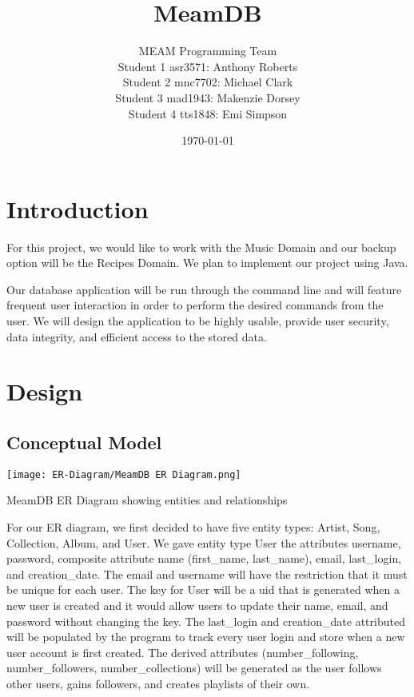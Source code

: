 \documentclass[12pt]{article}
\title{MeamDB}
\date{\today}
\author{MEAM Programming Team \\
Student 1 asr3571: Anthony Roberts\\
Student 2 mnc7702: Michael Clark\\
Student 3 mad1943: Makenzie Dorsey\\
Student 4 tts1848: Emi Simpson\\
}
\begin{document}
    \maketitle

    \section{Introduction}
    For this project, we would like to work with the Music Domain
    and our backup option will be the Recipes Domain. We plan to
    implement our project using Java.

    \vspace{0.5cm}

    \noindent Our database application will be run through the command line
    and will feature frequent user interaction in order to perform the desired
    commands from the user. We will design the application to be highly usable,
    provide user security, data integrity, and efficient access to the stored data.

    \section{Design}
    \subsection{Conceptual Model}

    \vspace{0.5cm}


    \begin{center}
    \texttt{[image: ER-Diagram/MeamDB ER Diagram.png]}
    \end{center}
    \caption{MeamDB ER Diagram showing entities and relationships}
    \label{ER Diagram}

    \vspace{0.5cm}

    \noindent For our ER diagram, we first decided to have five entity types:
    Artist, Song, Collection, Album, and User. We gave entity type User the attributes
    username, password, composite attribute name (first\_name, last\_name), email,
    last\_login, and creation\_date. The email and username will have the restriction that it must be unique
    for each user. The key for User will be a uid that is generated when a new user is
    created and it would allow users to update their name, email, and password without
    changing the key. The last\_login and creation\_date attributed will be populated by the program
    to track every user login and store when a new user account is first created. The derived attributes
    (number\_following, number\_followers, number\_collections) will be generated as the user
    follows other users, gains followers, and creates playlists of their own.
\end{document}
